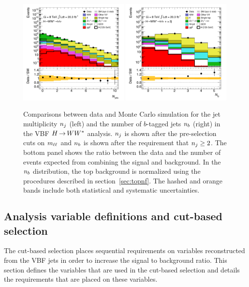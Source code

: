 \begin{figure}[h!]
  \centering
  \captionsetup{justification=centering}
  \includegraphics[width=0.49\textwidth]{figures/VBF_cb_njets}
  \includegraphics[width=0.49\textwidth]{figures/VBF_cb_nb}

  \caption{Comparisons between data and Monte Carlo simulation for the jet multiplicity $n_j$ (left) and the number of $b$-tagged jets $n_b$ (right) in the VBF $H{\,{\rightarrow}\,}WW^\ast$ analysis. $n_j$ is shown after the pre-selection cuts on $m_{\ell\ell}$ and $n_b$ is shown after the requirement that $n_j \geq 2$. The bottom panel shows the ratio between the data and the number of events expected from combining the signal and background. In the $n_b$ distribution, the top background is normalized using the procedures described in section~\ref{sec:topnf}. The hashed and orange bands include both statistical and systematic uncertainties.}
  \label{fig:njets}
\end{figure}

\subsection{Analysis variable definitions and cut-based selection}
\label{sec:vbf_cb_def}
The cut-based selection places sequential requirements on variables reconstructed from the VBF jets in order to increase the signal to background ratio. This section defines the variables that are used in the cut-based selection and details the requirements that are placed on these variables. 

